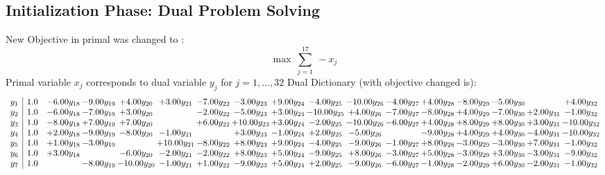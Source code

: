 \documentclass[9pt]{article}
\begin{document}
\subsection{Initialization Phase: Dual Problem Solving}
New Objective in primal was changed to : \[ \max\ \sum_{j=1}^{17}\ - x_j \] 
Primal variable $x_j$ corresponds to dual variable $y_j$ for $j = 1,\ldots,32$
Dual Dictionary (with objective changed is): 
\[\begin{array}{c| c c@{\hskip 2pt} c@{\hskip 2pt} c@{\hskip 2pt} c@{\hskip 2pt} c@{\hskip 2pt} c@{\hskip 2pt} c@{\hskip 2pt} c@{\hskip 2pt} c@{\hskip 2pt} c@{\hskip 2pt} c@{\hskip 2pt} c@{\hskip 2pt} c@{\hskip 2pt} c@{\hskip 2pt} c@{\hskip 2pt} }
 y_{1}   &  1.0 & -6.00 y_{18} & -9.00 y_{19} & +  4.00 y_{20} & +  3.00 y_{21} & -7.00 y_{22} & -3.00 y_{23} & +  9.00 y_{24} & -4.00 y_{25} & -10.00 y_{26} & -4.00 y_{27} & +  4.00 y_{28} & -8.00 y_{29} & -5.00 y_{30} &   & +  4.00 y_{32}\\
 y_{2}   &  1.0 & -6.00 y_{18} & -7.00 y_{19} & +  3.00 y_{20} &   & -2.00 y_{22} & -5.00 y_{23} & +  3.00 y_{24} & -10.00 y_{25} & +  4.00 y_{26} & -7.00 y_{27} & -8.00 y_{28} & +  4.00 y_{29} & -7.00 y_{30} & +  2.00 y_{31} & -1.00 y_{32}\\
 y_{3}   &  1.0 & -8.00 y_{18} & +  7.00 y_{19} & +  7.00 y_{20} &   & +  6.00 y_{22} & + 10.00 y_{23} & +  3.00 y_{24} & -2.00 y_{25} & -10.00 y_{26} & -6.00 y_{27} & +  4.00 y_{28} & +  8.00 y_{29} & +  8.00 y_{30} & +  3.00 y_{31} & -10.00 y_{32}\\
 y_{4}   &  1.0 & +  2.00 y_{18} & -9.00 y_{19} & -8.00 y_{20} & -1.00 y_{21} &   & +  3.00 y_{23} & -1.00 y_{24} & +  2.00 y_{25} & -5.00 y_{26} &   & -9.00 y_{28} & +  4.00 y_{29} & +  4.00 y_{30} & -4.00 y_{31} & -10.00 y_{32}\\
 y_{5}   &  1.0 & +  1.00 y_{18} & -3.00 y_{19} &   & + 10.00 y_{21} & -8.00 y_{22} & +  8.00 y_{23} & +  9.00 y_{24} & -4.00 y_{25} & -9.00 y_{26} & -1.00 y_{27} & +  8.00 y_{28} & -3.00 y_{29} & -3.00 y_{30} & +  7.00 y_{31} & -1.00 y_{32}\\
 y_{6}   &  1.0 & +  3.00 y_{18} &   & -6.00 y_{20} & -2.00 y_{21} & -2.00 y_{22} & +  8.00 y_{23} & +  5.00 y_{24} & -9.00 y_{25} & +  8.00 y_{26} & -3.00 y_{27} & +  5.00 y_{28} & -3.00 y_{29} & +  3.00 y_{30} & -3.00 y_{31} & -9.00 y_{32}\\
 y_{7}   &  1.0  &   & -8.00 y_{19} & -10.00 y_{20} & -1.00 y_{21} & +  1.00 y_{22} & -9.00 y_{23} & +  5.00 y_{24} & +  2.00 y_{25} & -9.00 y_{26} & -6.00 y_{27} & -1.00 y_{28} & -2.00 y_{29} & +  6.00 y_{30} & -2.00 y_{31} & -1.00 y_{32}\\

\end{array}\]
\end{document}
